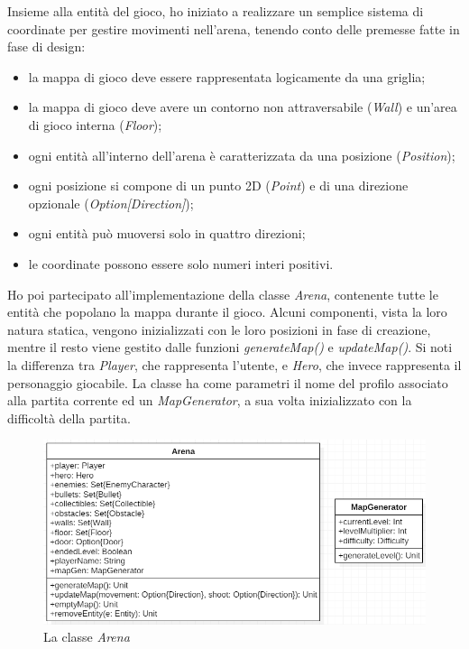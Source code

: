 Insieme alla entità del gioco, ho iniziato a realizzare un semplice sistema di coordinate per gestire movimenti nell'arena, tenendo conto delle premesse fatte in fase di design:
\begin{itemize}
    \item la mappa di gioco deve essere rappresentata logicamente da una griglia;
    \item la mappa di gioco deve avere un contorno non attraversabile (\textit{Wall}) e un'area di gioco interna (\textit{Floor});
    \item ogni entità all'interno dell'arena è caratterizzata da una posizione (\textit{Position});
    \item ogni posizione si compone di un punto 2D (\textit{Point}) e di una direzione opzionale (\textit{Option[Direction]});
    \item ogni entità può muoversi solo in quattro direzioni;
    \item le coordinate possono essere solo numeri interi positivi.
\end{itemize}

Ho poi partecipato all'implementazione della classe \textit{Arena}, contenente tutte le entità che popolano la mappa durante il gioco. Alcuni componenti, vista la loro natura statica, vengono inizializzati con le loro posizioni in fase di creazione, mentre il resto viene gestito dalle funzioni \textit{generateMap()} e \textit{updateMap()}. Si noti la differenza tra \textit{Player}, che rappresenta l'utente, e \textit{Hero}, che invece rappresenta il personaggio giocabile. La classe ha come parametri il nome del profilo associato alla partita corrente ed un \textit{MapGenerator}, a sua volta inizializzato con la difficoltà della partita.

\begin{figure}[H]
  \includegraphics[width=14cm]{res/arenaClass.png}
  \caption{La classe \textit{Arena}}
  \label{arenaCLass}
\end{figure}

